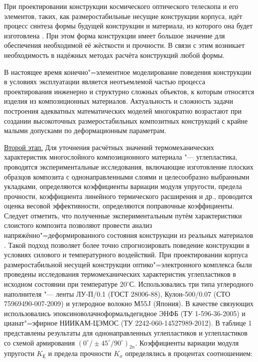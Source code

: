 При проектировании конструкции космического оптического телескопа и его элементов, таких, как размеростабильные несущие конструкции корпуса, идёт процесс синтеза формы будущей конструкции и материала, из которого она будет изготовлена \cite{bit:bib3, bit:bib12}. При этом форма конструкции имеет большое значение для обеспечения необходимой её жёсткости и прочности. В связи с этим возникает необходимость в надёжных методах расчёта конструкций любой формы.



В настоящее время конечно"=элементное моделирование поведения конструкции в условиях эксплуатации является неотъемлемой частью процесса проектирования инженерно и структурно сложных объектов, к которым относятся изделия из композиционных материалов. Актуальность и сложность задачи построения адекватных математических моделей многократно возрастают при создании высокоточных размеростабильных композитных конструкций с крайне малыми допусками по деформационным параметрам.



\underline {Второй этап.} Для уточнения расчётных значений термомеханических характеристик многослойного композиционного материала "--- углепластика, проводятся экспериментальные исследования, включающие изготовление плоских образцов композита с однонаправленными слоями и целесообразно выбранными укладками, определяются коэффициенты вариации модуля упругости, предела прочности, коэффициента линейного термического расширения и др., проводится оценка весовой эффективности, определяются поправочные коэффициенты. Следует отметить, что полученные экспериментальным путём характеристики слоистого композита позволяют провести анализ напряжённо"=деформированного состояния конструкции из реальных материалов \cite{bit:bib13}. Такой подход позволяет более точно спрогнозировать поведение конструкции в условиях силового и температурного воздействий. При проектировании корпуса размеростабильной несущей конструкции оптико"=электронного комплекса были проведены исследования термомеханических характеристик углепластиков в исходном состоянии при температуре $20^\circ С$. Использовались три типа углеродного наполнителя "--- ленты ЛУ-П/0.1 (ГОСТ 28006-88), Кулон-500/0.07 (СТО 75969490-007-2009) и углеродное волокно М55J (Япония). В качестве связующих использовались эпоксиноволачноформальдегидное ЭНФБ (ТУ 1-596-36-2005) и цианат"=эфирное НИИКАМ-ЦЭМОС (ТУ 2242-060-14527989-2012). В таблице 1 представлены результаты для однонаправленных углепластиков и углепластиков со схемой армирования \mbox{$(0^\circ/\pm45^\circ/90^\circ)_{2n}$}. Коэффициенты вариации модуля упругости $K_{Е}$ и предела прочности $K_{\sigma }$ определялись в процентах соотношением:

